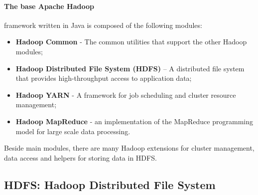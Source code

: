 \documentclass[a4paper,12pt,oneside]{report}
\begin{document}
\paragraph*{The base Apache Hadoop}framework \cite{apache_web} written in Java is composed of the following modules:
\begin{itemize}
\item \textbf{Hadoop Common} - The common utilities that support the other Hadoop modules;
\item \textbf{Hadoop Distributed File System (HDFS)} – A distributed file system that provides
 high-throughput access to application data;
\item \textbf{Hadoop YARN} - A framework for job scheduling and cluster resource management;
\item \textbf{Hadoop MapReduce} - an implementation of the MapReduce programming model 
for large scale data processing.
\end{itemize}
Beside main modules, there are many Hadoop extensions for cluster management, 
data access and helpers for storing data in HDFS.

		\subsection{HDFS: Hadoop Distributed File System}
\end{document}
